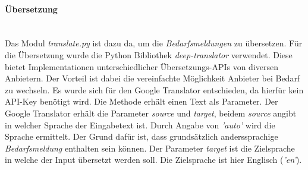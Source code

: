 \paragraph{Übersetzung}\mbox{}\\
Das Modul \emph{translate.py} ist dazu da, um die \emph{Bedarfsmeldungen} zu übersetzen. Für die Übersetzung wurde die Python Bibliothek \emph{deep-translator} verwendet. Diese bietet Implementationen unterschiedlicher Übersetzungs-APIs von diversen Anbietern. Der Vorteil ist dabei die vereinfachte Möglichkeit Anbieter bei Bedarf zu wechseln.
%	
Es wurde sich für den Google Translator entschieden, da hierfür kein API-Key benötigt wird. Die Methode erhält einen Text als Parameter. Der Google Translator erhält die Parameter \emph{source} und \emph{target}, beidem \emph{source} angibt in welcher Sprache der Eingabetext ist. Durch Angabe von \emph{'auto'} wird die Sprache ermittelt. Der Grund dafür ist, dass grundsätzlich anderssprachige \emph{Bedarfsmeldung} enthalten sein können. Der Parameter \emph{target} ist die Zielsprache in welche der Input übersetzt werden soll. Die Zielsprache ist hier Englisch (\emph{'en'}).
